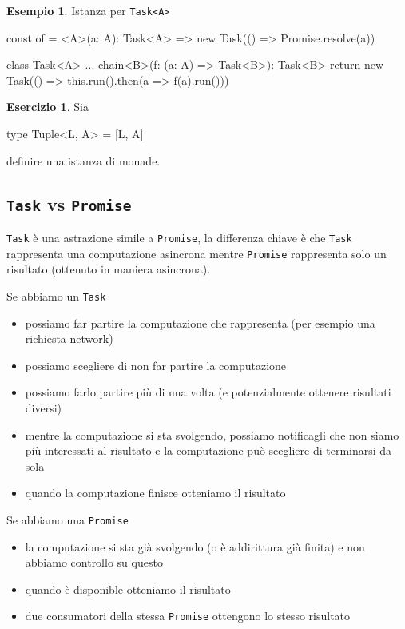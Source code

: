 \documentclass[12pt]{article}
\theoremstyle{definition}
\newtheorem{example}{Esempio}[section]
\newtheorem{exercise}{Esercizio}[section]
\newenvironment{code}
  {\vspace{0.5cm} \VerbatimEnvironment\begin{typescriptcode}}
  {\end{typescriptcode} \vspace{0.2cm}}
\begin{document}
\begin{example}
Istanza per \texttt{Task<A>}

\begin{code}
const of = <A>(a: A): Task<A> =>
  new Task(() => Promise.resolve(a))

class Task<A> {
  ...
  chain<B>(f: (a: A) => Task<B>): Task<B> {
    return new Task(() => this.run().then(a => f(a).run()))
  }
}
\end{code}
\end{example}

\begin{exercise}
Sia

\begin{code}
type Tuple<L, A> = [L, A]
\end{code}

definire una istanza di monade.
\end{exercise}

\subsection{\texttt{Task} vs \texttt{Promise}}

\texttt{Task} è una astrazione simile a \texttt{Promise}, la differenza chiave è che \texttt{Task} rappresenta una computazione asincrona
mentre \texttt{Promise} rappresenta solo un risultato (ottenuto in maniera asincrona).

Se abbiamo un \texttt{Task}

\begin{itemize}
  \item possiamo far partire la computazione che rappresenta (per esempio una richiesta network)
  \item possiamo scegliere di non far partire la computazione
  \item possiamo farlo partire più di una volta (e potenzialmente ottenere risultati diversi)
  \item mentre la computazione si sta svolgendo, possiamo notificagli che non siamo più interessati al risultato e la computazione può scegliere di terminarsi da sola
  \item quando la computazione finisce otteniamo il risultato
\end{itemize}

Se abbiamo una \texttt{Promise}

\begin{itemize}
  \item la computazione si sta già svolgendo (o è addirittura già finita) e non abbiamo controllo su questo
  \item quando è disponible otteniamo il risultato
  \item due consumatori della stessa \texttt{Promise} ottengono lo stesso risultato
\end{itemize}
\end{document}
